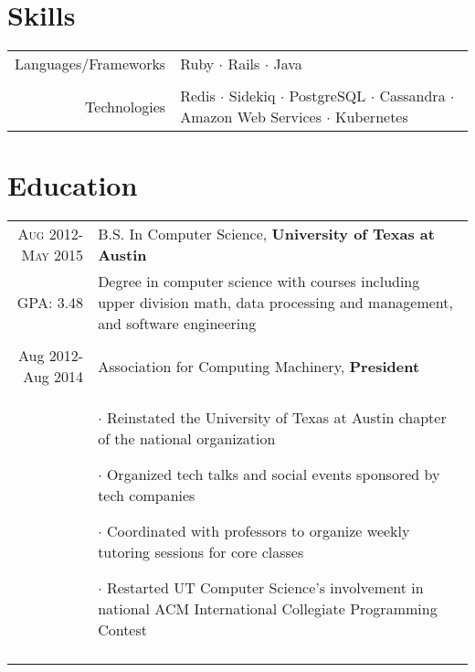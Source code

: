 \documentclass[a4paper,10pt]{article}
\begin{document}
\section{Skills}
\begin{tabular}{r|p{11cm}}
  Languages/Frameworks &\footnotesize{
    Ruby $\cdot$ Rails $\cdot$ Java
  }\\\multicolumn{2}{c}{} \\
  Technologies &\footnotesize{
    Redis $\cdot$ Sidekiq $\cdot$ PostgreSQL $\cdot$ Cassandra $\cdot$ Amazon Web Services $\cdot$ Kubernetes
  }
\end{tabular}

\section{Education}
\begin{tabular}{r|p{11cm}}
  \textsc{Aug 2012-May 2015} & B.S. In Computer Science, \textbf{University of Texas at Austin}\\
  \textsc{GPA}: 3.48 &
  \footnotesize{
    Degree in computer science with courses including upper division math, data processing and management, and software engineering
  }\\\multicolumn{2}{c}{} \\
  Aug 2012-Aug 2014 & Association for Computing Machinery, \textbf{President}\\&\footnotesize{
    $\cdot$ Reinstated the University of Texas at Austin chapter of the national organization

    $\cdot$ Organized tech talks and social events sponsored by tech companies

    $\cdot$ Coordinated with professors to organize weekly tutoring sessions for core classes

    $\cdot$ Restarted UT Computer Science's involvement in national ACM International Collegiate Programming Contest
  }
  \\\multicolumn{2}{c}{} \\
\end{tabular}


\end{document}
